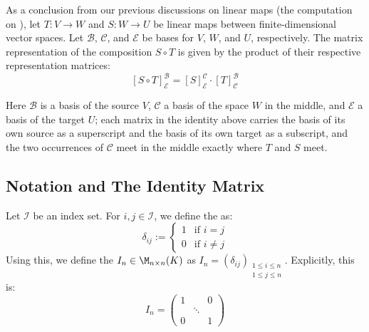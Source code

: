 As a conclusion from our previous discussions on linear maps (the computation on ), let $T: V \to W$ and $S: W \to U$ be linear maps between finite-di\-men\-sional vector spaces. Let $\mathcal{B}$, $\mathcal{C}$, and $\mathcal{E}$ be bases for $V$, $W$, and $U$, respectively. The matrix representation of the composition $S \circ T$ is given by the product of their respective representation matrices:
\[
    [S \circ T]_{\mathcal{E}}^{\mathcal{B}} = [S]_{\mathcal{E}}^{\mathcal{C}} \cdot [T]_{\mathcal{C}}^{\mathcal{B}}
\]

\begin{center}
\end{center}
Here $\mathcal{B}$ is a basis of the source $V$, $\mathcal{C}$ a basis of the space $W$ in the middle, and $\mathcal{E}$ a basis of the target $U$; each matrix in the identity above carries the basis of its own source as a superscript and the basis of its own target as a subscript, and the two occurrences of $\mathcal{C}$ meet in the middle exactly where $T$ and $S$ meet.


\subsection{Notation and The Identity Matrix}

Let $\mathcal{I}$ be an index set. For $i, j \in \mathcal{I}$, we define the  as:
\begin{equation*}
    \delta_{ij} := \begin{cases} 1 & \text{if } i = j \\ 0 & \text{if } i \neq j \end{cases}
\end{equation*}
Using this, we define the  $I_n \in \M_{n \times n}(K)$ as $I_n = (\delta_{ij})_{\substack{1 \le i \le n \\ 1 \le j \le n}}$. Explicitly, this is:
\begin{equation*}
    I_n = \begin{pmatrix} 1 & & 0 \\ & \ddots & \\ 0 & & 1 \end{pmatrix}
\end{equation*}


